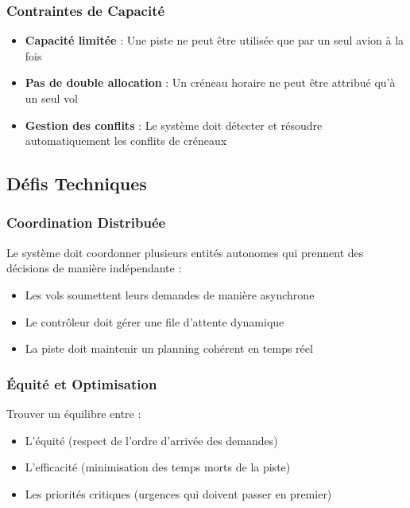 \documentclass[12pt,a4paper]{article}
\begin{document}
\subsubsection{Contraintes de Capacité}

\begin{itemize}[leftmargin=*]
    \item[\color{primaryblue}$\blacktriangleright$] \textbf{Capacité limitée} : Une piste ne peut être utilisée que par un seul avion à la fois

    \item[\color{primaryblue}$\blacktriangleright$] \textbf{Pas de double allocation} : Un créneau horaire ne peut être attribué qu'à un seul vol

    \item[\color{primaryblue}$\blacktriangleright$] \textbf{Gestion des conflits} : Le système doit détecter et résoudre automatiquement les conflits de créneaux
\end{itemize}

\subsection{Défis Techniques}

\subsubsection{Coordination Distribuée}

Le système doit coordonner plusieurs entités autonomes qui prennent des décisions de manière indépendante :
\begin{itemize}[leftmargin=*]
    \item Les vols soumettent leurs demandes de manière asynchrone
    \item Le contrôleur doit gérer une file d'attente dynamique
    \item La piste doit maintenir un planning cohérent en temps réel
\end{itemize}

\subsubsection{Équité et Optimisation}

Trouver un équilibre entre :
\begin{itemize}[leftmargin=*]
    \item L'équité (respect de l'ordre d'arrivée des demandes)
    \item L'efficacité (minimisation des temps morts de la piste)
    \item Les priorités critiques (urgences qui doivent passer en premier)
\end{itemize}
\end{document}
